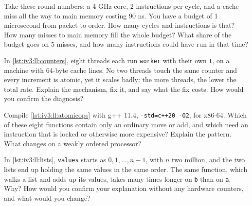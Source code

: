 \begin{question}\label{iq:iv3:low-latency:5}
Take these round numbers: a 4 GHz core, 2 instructions per cycle, and a cache miss all the way to main memory costing 90 ns. You have a budget of 1 microsecond from packet to order. How many cycles and instructions is that? How many misses to main memory fill the whole budget? What share of the budget goes on 5 misses, and how many instructions could have run in that time?
\end{question}

\begin{question}\label{iq:iv3:low-latency:6}
In \cref{lst:iv3:ll:counters}, eight threads each run \texttt{worker} with their own \texttt{t}, on a machine with 64-byte cache lines. No two threads touch the same counter and every increment is atomic, yet it scales badly: the more threads, the lower the total rate. Explain the mechanism, fix it, and say what the fix costs. How would you confirm the diagnosis?
\label{lst:iv3:ll:counters}
\end{question}

\begin{question}\label{iq:iv3:low-latency:7}
Compile \cref{lst:iv3:ll:atomicops} with g++ 11.4, \texttt{-std=c++20 -O2}, for x86-64. Which of these eight functions contain only an ordinary move or add, and which need an instruction that is locked or otherwise more expensive? Explain the pattern. What changes on a weakly ordered processor?
\label{lst:iv3:ll:atomicops}
\end{question}

\begin{question}\label{iq:iv3:low-latency:8}
In \cref{lst:iv3:ll:lists}, \texttt{values} starts as $0, 1, \dots, n-1$, with $n$ two million, and the two lists end up holding the same values in the same order. The same function, which walks a list and adds up its values, takes many times longer on \texttt{b} than on \texttt{a}. Why? How would you confirm your explanation without any hardware counters, and what would you change?
\label{lst:iv3:ll:lists}
\end{question}

